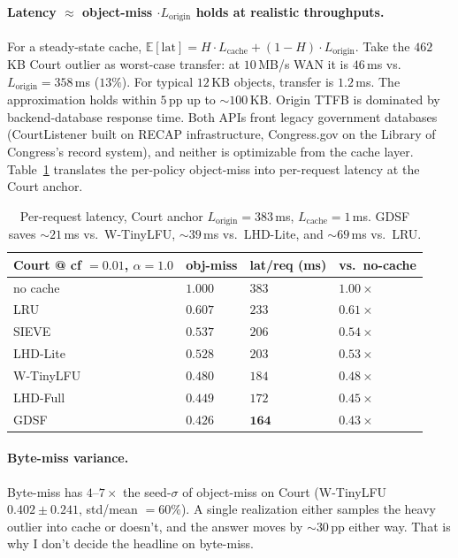 \documentclass[letterpaper,twocolumn,10pt]{article}
\begin{document}
\paragraph{Latency $\approx$ object-miss $\cdot L_{\text{origin}}$
holds at realistic throughputs.} For a steady-state cache,
$\mathbb{E}[\text{lat}] = H \cdot L_{\text{cache}} + (1-H) \cdot
L_{\text{origin}}$. Take the $462$\,KB Court outlier as worst-case
transfer: at $10$\,MB/s WAN it is $46$\,ms vs.\ $L_{\text{origin}}
= 358$\,ms ($13\%$). For typical $12$\,KB objects, transfer is
$1.2$\,ms. The approximation holds within $5$\,pp up to
$\sim 100$\,KB. Origin TTFB is dominated by backend-database
response time. Both APIs front legacy government databases
(CourtListener built on RECAP infrastructure, Congress.gov on the
Library of Congress's record system), and neither is optimizable
from the cache layer. Table~\ref{tab:lat} translates the per-policy
object-miss into per-request latency at the Court anchor.
\begin{table}[t]
\centering
\footnotesize
\renewcommand{\arraystretch}{0.95}
\begin{tabularx}{\columnwidth}{@{}lXXX@{}}
\toprule
\textbf{Court @ cf $= 0.01$, $\alpha = 1.0$} & \textbf{obj-miss} & \textbf{lat/req (ms)} & \textbf{vs.\ no-cache} \\
\midrule
no cache  & $1.000$        & $383$ & $1.00\times$ \\
LRU       & $0.607$        & $233$ & $0.61\times$ \\
SIEVE     & $0.537$        & $206$ & $0.54\times$ \\
LHD-Lite  & $0.528$        & $203$ & $0.53\times$ \\
W-TinyLFU & $0.480$        & $184$ & $0.48\times$ \\
LHD-Full  & $0.449$        & $172$ & $0.45\times$ \\
GDSF      & $\mathbf{0.426}$ & $\mathbf{164}$ & $\mathbf{0.43\times}$ \\
\bottomrule
\end{tabularx}
\caption{Per-request latency, Court anchor $L_{\text{origin}} = 383$\,ms,
$L_{\text{cache}} = 1$\,ms. GDSF saves $\sim 21$\,ms vs.\
W-TinyLFU, $\sim 39$\,ms vs.\ LHD-Lite, and $\sim 69$\,ms vs.\
LRU.}
\label{tab:lat}
\end{table}
\paragraph{Byte-miss variance.} Byte-miss has $4$--$7\times$ the
seed-$\sigma$ of object-miss on Court (W-TinyLFU $0.402 \pm 0.241$,
std/mean $= 60\%$). A single realization either samples the heavy
outlier into cache or doesn't, and the answer moves by $\sim 30$\,pp
either way. That is why I don't decide the headline on byte-miss.
\end{document}
